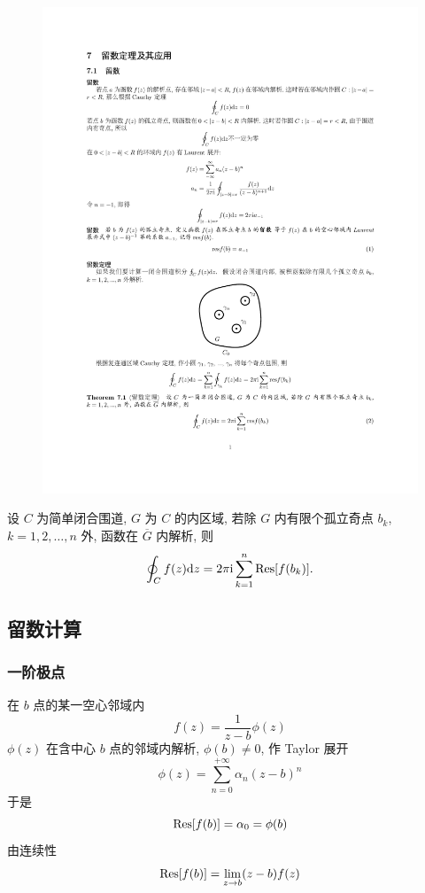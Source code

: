 \begin{figure}[H]
    \centering
    \includegraphics{figures/liushu1.pdf}
    \caption{}
\end{figure}

\begin{theorem}[留数定理]
    设 $C$ 为简单闭合围道, $G$ 为 $C$ 的内区域, 若除 $G$ 内有限个孤立奇点 $b_k$, $k=1,2,\dots,n$ 外, 函数在 $\overline{G}$ 内解析, 则
    $$\oint_{C}f(z)\dd z=2\pi\i\sum_{k=1}^{n}\Res[f(b_k)].$$
\end{theorem}

\subsection{留数计算}

\subsubsection{一阶极点}

在 $b$ 点的某一空心邻域内 $$f(z)=\dfrac{1}{z-b}\phi(z)$$
$\phi(z)$ 在含中心 $b$ 点的邻域内解析, $\phi(b)\neq 0$, 作 Taylor 展开 $$\phi(z)=\sum_{n=0}^{+\infty}\alpha_n(z-b)^n$$
于是 $$\Res[f(b)]=\alpha_0=\phi(b)$$
由连续性 $$\Res[f(b)]=\lim_{z\to b}(z-b)f(z)$$

